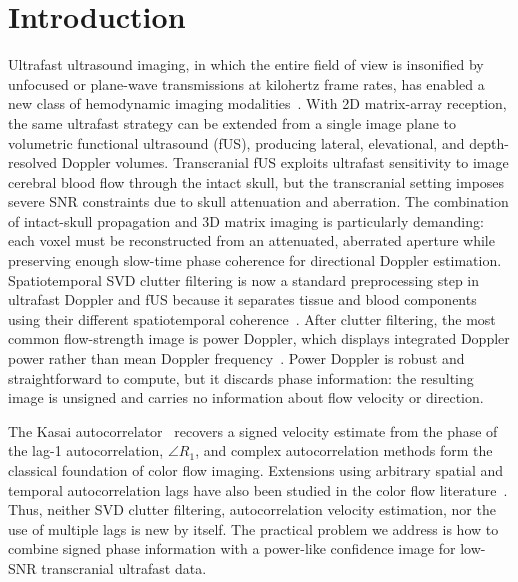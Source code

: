 \documentclass[11pt]{article}
\begin{document}
\section{Introduction}
\label{sec:intro}

Ultrafast ultrasound imaging, in which the entire field of view is
insonified by unfocused or plane-wave transmissions at kilohertz frame
rates, has enabled a new class of hemodynamic imaging
modalities~\cite{demene2015svd,tremblaydarveau2017coherencepd}.  With
2D matrix-array reception, the same ultrafast strategy can be extended
from a single image plane to volumetric functional ultrasound (fUS),
producing lateral, elevational, and depth-resolved Doppler volumes.
Transcranial fUS exploits ultrafast sensitivity to image cerebral blood
flow through the intact skull, but the transcranial setting imposes
severe SNR constraints due to skull attenuation and aberration.  The
combination of intact-skull propagation and 3D matrix
imaging is particularly demanding: each voxel must be reconstructed
from an attenuated, aberrated aperture while preserving enough
slow-time phase coherence for directional Doppler estimation.
Spatiotemporal SVD clutter filtering is now a standard
preprocessing step in ultrafast Doppler and fUS because it separates
tissue and blood components using their different spatiotemporal
coherence~\cite{demene2015svd}.  After clutter filtering, the most
common flow-strength image is power Doppler, which displays integrated
Doppler power rather than mean Doppler frequency~\cite{rubin1994powerdoppler}.
Power Doppler is robust and straightforward to compute, but it discards
phase information: the resulting image is unsigned and carries no
information about flow velocity or direction.

The Kasai autocorrelator~\cite{kasai1985autocorrelation} recovers a
signed velocity estimate from the phase of the lag-1 autocorrelation,
$\angle R_1$, and complex autocorrelation methods form the classical
foundation of color flow imaging.  Extensions using arbitrary spatial
and temporal autocorrelation lags have also been studied in the color
flow literature~\cite{torp1994autocorrelation}.  Thus, neither SVD
clutter filtering, autocorrelation velocity estimation, nor the use of
multiple lags is new by itself.  The practical problem we address is how
to combine signed phase information with a power-like confidence image
for low-SNR transcranial ultrafast data.
\end{document}
